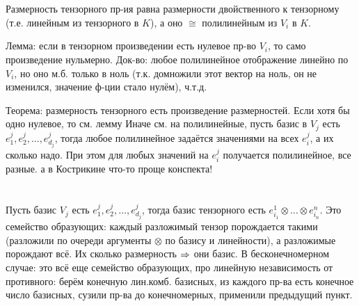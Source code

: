 \section{} %
Размерность тензорного пр-ия равна размерности двойственного к тензорному (т.е. линейным из тензорного в $K$),
а оно $\cong$ полилинейным из $V_i$ в $K$.

Лемма: если в тензорном произведении есть нулевое пр-во $V_i$, то само произведение нульмерно.
Док-во: любое полилинейное отображение линейно по $V_i$, но оно м.б. только в ноль (т.к. домножили этот вектор на ноль,
он не изменился, значение ф-ции стало нулём), ч.т.д.

Теорема: размерность тензорного есть произведение размерностей.
Если хотя бы одно нулевое, то см. лемму
Иначе см. на полилинейные, пусть базис в $V_j$ есть $e_1^j, e_2^j, \dots, e_{d_j}^j$, тогда любое полилинейное
задаётся значениями на всех $e_i^j$, а их сколько надо.
При этом для любых значений на $e_i^j$ получается полилинейное, все разные.
\TODO а в Кострикине что-то проще конспекта!

\section{} %
Пусть базис $V_j$ есть $e_1^j, e_2^j, \dots, e_{d_j}^j$,
тогда базис тензорного есть $e_{i_1}^1 \otimes \dots \otimes e_{i_n}^n$.
Это семейство образующих: каждый разложимый тензор порождается такими (разложили по очереди аргументы $\otimes$ по базису и линейности),
а разложимые порождают всё.
Их сколько размерность $\Rightarrow$ они базис.
В бесконечномерном случае: это всё еще семейство образующих, про линейную независимость от противного: берём конечную лин.комб.
базисных, из каждого пр-ва есть конечное число базисных, сузили пр-ва до конечномерных, применили предыдущий пункт.

\section{} %
\TODO
